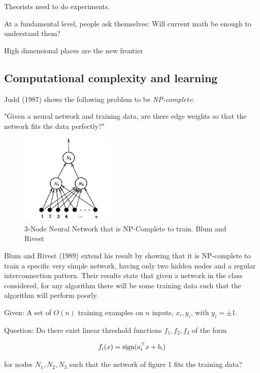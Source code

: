 \documentclass[english]{article}
\begin{document}
\item Theorists need to do experiments. 

\item At a fundamental level, people ask themselves: Will current math be enough to understand them?

High dimensional places are the new frontier
\eitem


\subsection{Computational complexity and learning}

\benum 
\item 
Judd (1987) shows the following
problem to be \emph{NP-complete}:


"Given a neural network and training data, are there edge weights so that the network fits the data perfectly?"

\begin{figure}
  \centering
  \includegraphics[width=0.4\textwidth]{br.png}
  \caption{3-Node Neural Network that is
NP-Complete to train. Blum and Rivest}
\end{figure}


Blum and Rivest (1989) extend his result by showing that it is NP-complete to train a specific very
simple network, having only two hidden nodes and a regular interconnection
pattern. Their results state that given a network in the class considered, for any
algorithm there will be some training data such that the algorithm
will perform poorly.

Given: A set of $O(n)$ training examples on $n$ inputs, $x_i,y_i$, with $y_i  = \pm 1$.

Question: Do there exist linear threshold functions $f_1,f_2,f_3$ of the form

$$f_i(x) = \operatorname{sign}(a_i^\top x + b_i)$$

for nodes $N_1, N_2, N_3$ such that the network of figure 1 fits the training data?
\end{document}
